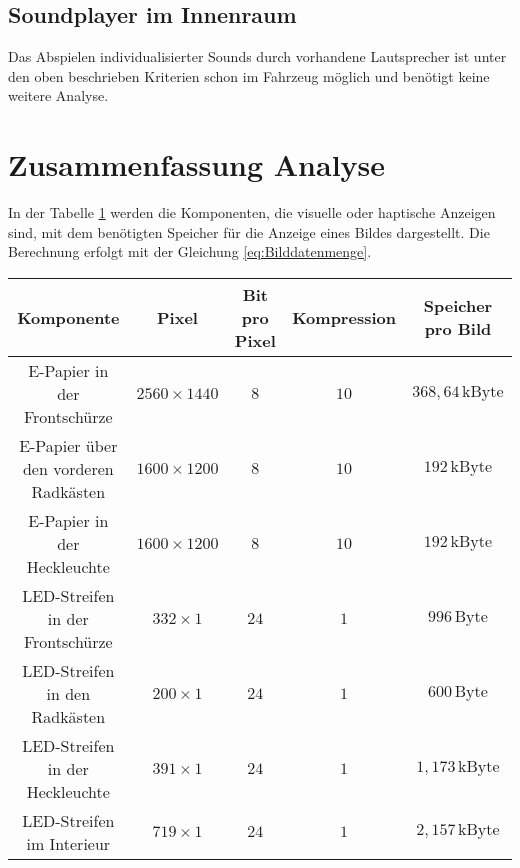 \subsection{Soundplayer im Innenraum}
Das Abspielen individualisierter Sounds durch vorhandene Lautsprecher ist unter den oben beschrieben Kriterien schon im Fahrzeug möglich und benötigt keine weitere Analyse.
\section{Zusammenfassung Analyse} \label{ZusammendassungAnalyse}
In der Tabelle \ref{tab:Speicherbedarf} werden die Komponenten, die visuelle oder haptische Anzeigen sind, mit dem benötigten Speicher für die Anzeige eines Bildes dargestellt. Die Berechnung erfolgt mit der Gleichung \ref{eq:Bilddatenmenge}.
\begin{table}[hbt]	
	\centering
	\renewcommand{\arraystretch}{1.5}	%
	\label{tab:Speicherbedarf}
	\begin{tabular}{c|cccc}
		\textbf{Komponente} & \parbox[t]{0.1\linewidth}{\centering Pixel} & \parbox[t]{0.11\linewidth}{\centering Bit pro Pixel} & \parbox[t]{0.15\linewidth}{\centering Kompression} & \parbox[t]{0.1\linewidth}{\centering Speicher pro Bild} \\ 
		\hline 
		\hline 
		\parbox[t]{0.3\linewidth}{\centering E-Papier in der Frontschürze} & $ 2560 \times 1440 $ & $ 8 $ & $ 10 $ & $ 368,64\,\mathrm{kByte} $\\ \parbox[t]{0.3\linewidth}{\centering E-Papier über den vorderen Radkästen} & $ 1600 \times 1200 $ & $ 8 $ & $ 10 $ & $ 192\,\mathrm{kByte} $ \\
		\parbox[t]{0.3\linewidth}{\centering E-Papier in der Heckleuchte} & $ 1600 \times 1200 $ & $ 8 $ & $ 10 $ & $ 192\,\mathrm{kByte} $ \\
		\parbox[t]{0.3\linewidth}{\centering LED-Streifen in der Frontschürze} & $ 332 \times 1 $ & $ 24 $ & $ 1 $ & $ 996\,\mathrm{Byte} $ \\
		\parbox[t]{0.3\linewidth}{\centering LED-Streifen in den Radkästen} & $ 200 \times 1 $ & $ 24 $ & $ 1 $ & $ 600\,\mathrm{Byte} $\\ \parbox[t]{0.3\linewidth}{\centering LED-Streifen in der Heckleuchte} & $ 391 \times 1 $ & $ 24 $ & $ 1 $ & $ 1,173\,\mathrm{kByte} $ \\ 
		\parbox[t]{0.3\linewidth}{\centering LED-Streifen im Interieur} & $ 719 \times 1 $ & $ 24 $ & $ 1 $ & $ 2,157\,\mathrm{kByte} $ \\

\end{tabular}
\end{table}
